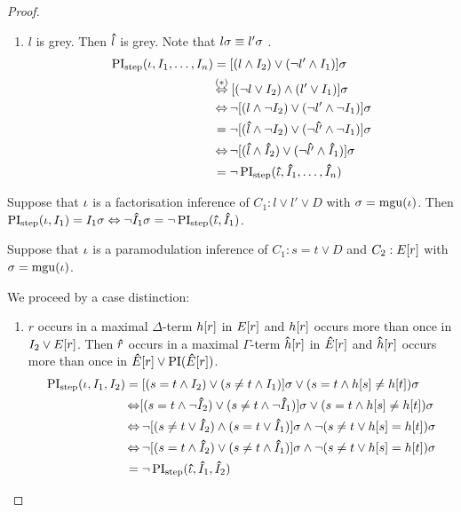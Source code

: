 \begin{proof}
\begin{indproof}
\begin{enumerate}
				\item $l$ is grey. Then $\bm\hat{l}$ is grey. 
					Note that $l\sigma \equiv l'\sigma$ \markB.
					\nopagebreak 
					\begin{align*}
						\PIstep(\inference, I_1, \dots, I_n) 
						&=  [(l \land I_2) \lor (\lnot l'  \land I_1)]\sigma\\
						&\hspace{-1pt}\stackrel{\mathclap{\markB}}\semiff[(\lnot l \lor I_2) \land (l' \lor I_1)]\sigma\\
						 &\semiff \lnot [(l \land \lnot I_2) \lor (\lnot l'  \land \lnot I_1)]\sigma\\
						 &= \lnot [(\p l \land\lnot I_2 ) \lor (\lnot \p{l'}\land \lnot I_1 )]\sigma\\
						 &\semiff \lnot  [(\p l \land \p I_2 ) \lor (\lnot \p{l'} \land \p I_1)]\sigma \\
						 &= \lnot \PIstep(\p \inference, \p I_1, \dots, \p I_n)
					\end{align*}
			\end{enumerate}

					Suppose that $\iota$ is a factorisation inference of $C_1: l \lor l' \lor D$
					with $\sigma = \operatorname{mgu}(\iota)$.
					Then $\operatorname{PI}_{\mathrm{step}}(\iota, I_1) = I_1\sigma \;{\operatorname{\Leftrightarrow}}\; \lnot \bm\hat{I}_1\sigma = \lnot \operatorname{PI}_{\mathrm{step}}(\bm\hat{\iota}, \bm\hat{I}_1)$.

					Suppose that $\iota$ is a paramodulation inference of $C_1: s=t \lor D$ and $C_2: E[r]$ 
					with $\sigma = \operatorname{mgu}(\iota)$.

					We proceed by a case distinction:

					\begin{enumerate}
						\item $r$ occurs in a maximal $\Delta$-term $h[r]$ in $E[r]$ and $h[r]$ occurs more than once in $I_2 \lor E[r]$.
							Then $\bm\hat{r}$ occurs in a maximal $\Gamma$-term $\bm\hat{h}[r]$ in $\bm\hat{E}[r]$ and $\bm\hat{h}[r]$ occurs more than once in $\bm\hat{E}[r] \lor \operatorname{PI}(\bm\hat{E}[r])$.
							\begin{align*}
								\operatorname{PI}_{\mathrm{step}}(\iota, I_1, I_2) &= [ ( s=t \land I_2 ) \lor (s\neq t \land I_1) ]\sigma \lor (s=t \land h[s] \neq h[t])\sigma\\
														&\operatorname{\Leftrightarrow} [ ( s=t \land \lnot \bm\hat{I}_2 ) \lor (s\neq t \land \lnot \bm\hat{I}_1) ]\sigma \lor (s=t \land h[s] \neq h[t])\sigma\\
														&\operatorname{\Leftrightarrow} \lnot [ ( s\neq t \lor \bm\hat{I}_2 ) \land (s= t \lor \bm\hat{I}_1) ]\sigma \land \lnot (s\neq t \lor h[s] = h[t])\sigma\\
														&\operatorname{\Leftrightarrow} \lnot [ ( s = t \land \bm\hat{I}_2 ) \lor (s\neq t \land \bm\hat{I}_1) ]\sigma \land \lnot (s\neq t \lor h[s] = h[t])\sigma\\
													 &= \lnot \operatorname{PI}_{\mathrm{step}}(\bm\hat{\iota}, \bm\hat{I}_1, \bm\hat{I}_2)
							\end{align*}


\end{enumerate}
\end{indproof}
\end{proof}

